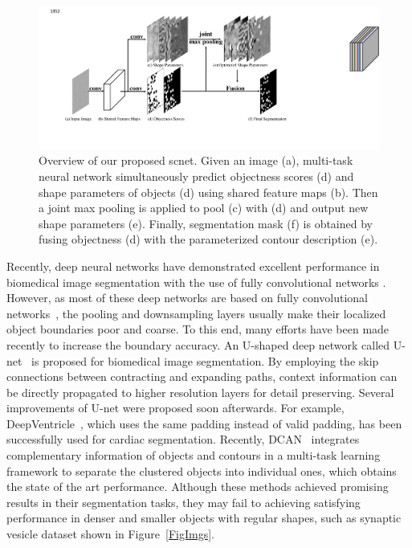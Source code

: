 \begin{figure}
    \begin{center}
        \includegraphics[width=6.3in]{figures/FigSCNN.pdf}
    \end{center}
    \caption{Overview of our proposed scnet. Given an image (a), multi-task neural network simultaneously predict objectness scores (d) and shape parameters of objects (d) using shared feature maps (b).
    Then a joint max pooling is applied to pool (c) with (d) and output new shape parameters (e).
    Finally, segmentation mask (f) is obtained by fusing objectness (d) with the parameterized contour description (e).}
    \label{FigSCNN}
\end{figure}

Recently, deep neural networks have demonstrated excellent performance in biomedical image segmentation with the use of fully convolutional networks \cite{Dhungel2015,Ronneberger2015,Roth2015,Chen2015,Lieman-Sifry2017,Xu2016,Chen2016b}.
However, as most of these deep networks are based on fully convolutional networks~\cite{Long2015}, the pooling and downsampling layers usually make their localized object boundaries poor and coarse.
To this end, many efforts have been made recently to increase the boundary accuracy.
An U-shaped deep network called U-net~\cite{Ronneberger2015} is proposed for biomedical image segmentation.
By employing the skip connections between contracting and expanding paths, context information can be directly propagated to higher resolution layers for detail preserving.
Several improvements of U-net were proposed soon afterwards.
For example, DeepVentricle~\cite{Lieman-Sifry2017}, which uses the same padding instead of valid padding, has been successfully used for cardiac segmentation.
Recently, DCAN~\cite{Chen2016a} integrates complementary information of objects and contours in a multi-task learning framework to separate the clustered objects into individual ones, which obtains the state of the art performance.
Although these methods achieved promising results in their segmentation tasks, they may fail to achieving satisfying performance in denser and smaller objects with regular shapes, such as synaptic vesicle dataset shown in Figure~\ref{FigImgs}.

